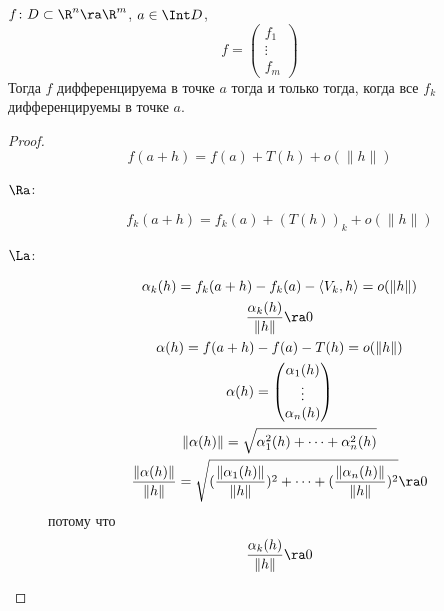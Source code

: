 \begin{theorem}
	$f \colon D \subset \R^n \ra \R^m$, $a \in \Int D$,
	\[
		f =
			\begin{pmatrix}
				f_1\\
				\vdots\\
				f_m
			\end{pmatrix}
	\]
	Тогда $f$ дифференцируема в точке $a$ тогда и только тогда, когда все $f_k$ дифференцируемы в точке $a$.
\end{theorem}
\begin{proof}
	\[ f(a + h) = f(a) + T(h) + o(\|h\|) \]
	\begin{description}
	\item[$\Ra$:]
		\[ f_k(a + h) = f_k(a) + (T(h))_k + o(\|h\|) \]

	\item[$\La$:]
		\begin{gather*}
			\alpha_k(h) = f_k(a+h) - f_k(a) - \left<V_k, h\right> = o(\|h\|) \\
			\frac{\alpha_k(h)}{\|h\|} \ra 0 \\
			\alpha(h) = f(a+h) - f(a) - T(h) = o(\|h\|) \\
			\alpha(h) =
				\begin{pmatrix}
					\alpha_1(h)\\
					\vdots\\
					\alpha_n(h)
				\end{pmatrix} \\
			\|\alpha(h)\| = \sqrt{\alpha_1^2(h) +\dots + \alpha_n^2(h)} \\
			\frac{\|\alpha(h)\|}{\|h\|} = \sqrt{(\frac{\|\alpha_1(h)\|}{\|h\|}) ^ 2 + \dots + (\frac{\|\alpha_n(h)\|}{\|h\|}) ^ 2} \ra 0
		\end{gather*}
		потому что
		\[ \frac{\alpha_k(h)}{\|h\|} \ra 0 \]
	\end{description}
\end{proof}

